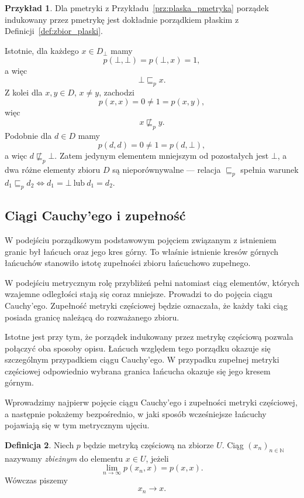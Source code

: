 \documentclass[11pt,a4paper]{article}
\theoremstyle{definition}
\newtheorem{definicja}{Definicja}[section]
\newtheorem{przyklad}[definicja]{Przykład}
\theoremstyle{plain}
\newcommand{\bt}{\bot}                            %
\begin{document}
\begin{przyklad}\label{prz:porzadek_pmetryka_plaska}
	Dla pmetryki z Przykładu~\ref{prz:plaska_pmetryka} porządek
	indukowany przez pmetrykę jest dokładnie porządkiem płaskim
	z Definicji~\ref{def:zbior_plaski}.
	
	Istotnie, dla każdego $x\in D_\bt$ mamy
	\[
	p(\bt,\bt)=p(\bt,x)=1,
	\]
	a więc
	\[
	\bt\sqsubseteq_p x.
	\]
	Z kolei dla $x,y\in D$, $x\neq y$, zachodzi
	\[
	p(x,x)=0
	\neq
	1=p(x,y),
	\]
	więc
	\[
	x\not\sqsubseteq_p y.
	\]
	Podobnie dla $d\in D$ mamy
	\[
	p(d,d)=0
	\neq
	1=p(d,\bt),
	\]
	a więc $d\not\sqsubseteq_p\bt$. Zatem jedynym elementem mniejszym od
	pozostałych jest $\bt$, a dwa różne elementy zbioru $D$ są
	nieporównywalne --- relacja $\sqsubseteq_p$ spełnia warunek
	$d_1\sqsubseteq_p d_2\iff d_1=\bt\ \text{lub}\ d_1=d_2$.
\end{przyklad}

\subsection{Ciągi Cauchy'ego i zupełność}

W podejściu porządkowym podstawowym pojęciem związanym z istnieniem granic
był łańcuch oraz jego kres górny. To właśnie istnienie kresów górnych
łańcuchów stanowiło istotę zupełności zbioru łańcuchowo zupełnego.

W podejściu metrycznym rolę przybliżeń pełni natomiast ciąg elementów,
których wzajemne odległości stają się coraz mniejsze. Prowadzi to do
pojęcia ciągu Cauchy'ego. Zupełność metryki częściowej będzie oznaczała,
że każdy taki ciąg posiada granicę należącą do rozważanego zbioru.

Istotne jest przy tym, że porządek indukowany przez metrykę częściową
pozwala połączyć oba sposoby opisu. Łańcuch względem tego porządku okazuje
się szczególnym przypadkiem ciągu Cauchy'ego. W przypadku zupełnej
metryki częściowej odpowiednio wybrana granica łańcucha okazuje się jego
kresem górnym.

Wprowadzimy najpierw pojęcie ciągu Cauchy'ego i zupełności metryki
częściowej, a następnie pokażemy bezpośrednio, w jaki sposób wcześniejsze
łańcuchy pojawiają się w tym metrycznym ujęciu.

\begin{definicja}\label{def:zbieznosc_pmetryka}
	Niech $p$ będzie metryką częściową na zbiorze $U$. Ciąg
	$(x_n)_{n\in\mathbb{N}}$ nazywamy \emph{zbieżnym} do elementu
	$x\in U$, jeżeli
	\[
	\lim_{n\to\infty}p(x_n,x)=p(x,x).
	\]
	Wówczas piszemy
	\[
	x_n\longrightarrow x.
	\]
\end{definicja}
\end{document}
